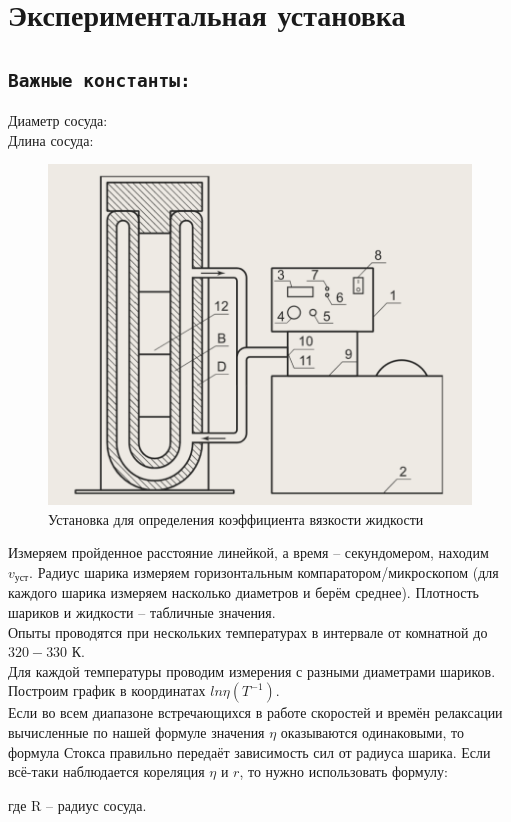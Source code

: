 \documentclass[11pt,a4paper]{article}
\begin{document}
\newpage

\section*{Экспериментальная установка}
\subsection*{\texttt{Важные константы:}}
  \indent Диаметр сосуда:\\
  \indent Длина сосуда:\\

\begin{figure}[h!]
  \includegraphics*[width=\textwidth]{ust.png}
  \caption{Установка для определения коэффициента
  вязкости жидкости}
  \label{fig:ust}
\end{figure}

Измеряем пройденное расстояние линейкой, а время -- секундомером,
находим $v_\text{уст}$. Радиус шарика измеряем горизонтальным
компаратором/микроскопом (для каждого шарика измеряем насколько диаметров и берём среднее).
Плотность шариков и жидкости -- табличные значения.\\
Опыты проводятся при нескольких температурах в интервале от
комнатной до $320-330$ К.\\
Для каждой температуры проводим измерения с разными диаметрами шариков.\\
Построим график в координатах $ln\eta (T^{-1})$.\\
Если во всем диапазоне встречающихся в работе 
скоростей и времён релаксации вычисленные по нашей формуле
значения $\eta$ оказываются одинаковыми, то формула Стокса правильно
передаёт зависимость сил от радиуса шарика.
Если всё-таки наблюдается кореляция $\eta$ и $r$, то нужно использовать формулу:
\begin{center}{
  }\end{center}
где R --  радиус сосуда.
  
\end{document}
